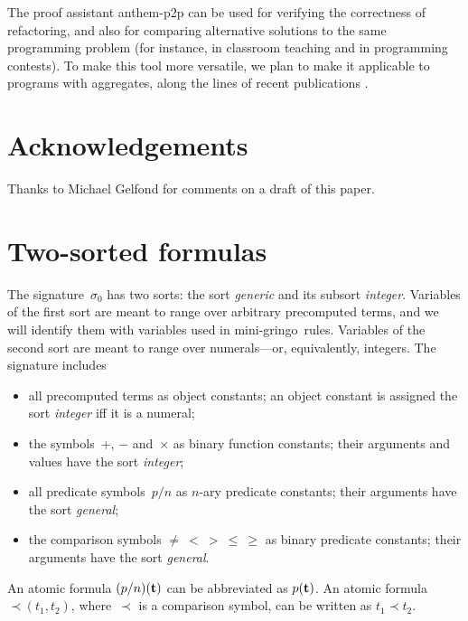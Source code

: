 \documentclass{new_tlp}
\def\gringo{{\sc gringo}}
\begin{document}
The proof assistant {\sc anthem-p2p} can be used for verifying the
correctness of refactoring, and also for comparing alternative
solutions to the same programming problem (for instance, in classroom
teaching and in programming contests).
To make this tool more versatile, we plan to make it applicable to
programs with aggregates, along the lines of recent publications
\cite{fan22a,lif22a}.

\section*{Acknowledgements}

Thanks to Michael Gelfond for comments on a draft of this paper.




\appendix

\section{Two-sorted formulas} \label{appa}

The signature~$\sigma_0$ \cite[Section~2.2]{fan22}
has two sorts: the sort \emph{generic} and its subsort
\emph{integer}.
Variables of the first sort are meant to
range over arbitrary precomputed terms, and we will identify them with
variables used in mini-\gringo\ rules.  Variables of the second sort are meant
to range over numerals---or, equivalently, integers.
The signature includes
\begin{itemize}
\item all precomputed terms as object constants; an object constant
  is assigned the sort \emph{integer} iff it is a numeral;
\item the symbols~$+$, $-$ and~$\times$ as binary function constants;
  their arguments and values have the sort \emph{integer};
\item all predicate symbols~$p/n$ as $n$-ary predicate
  constants; their arguments have the sort \emph{general};
\item the comparison symbols
$\neq\ <\ >\ \leq\ \geq$
as binary predicate constants; their arguments have the sort \emph{general}.
\end{itemize}
An atomic formula $(p/n)({\bf t})$ can be abbreviated
as $p({\bf t})$. An atomic formula $\prec\!\!(t_1,t_2)$, where~$\prec$ is a
comparison symbol, can be written as $t_1\prec t_2$.
\end{document}
